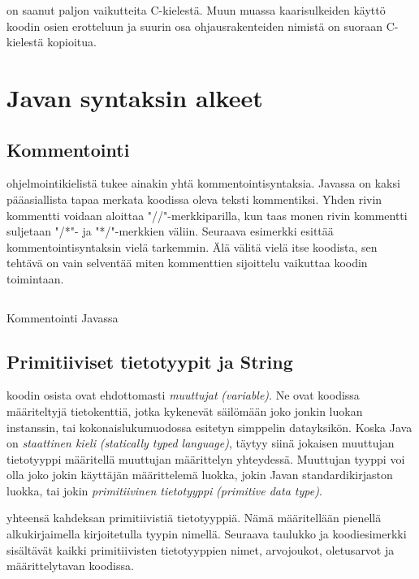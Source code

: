 \documentclass{tufte-book}
\newcommand{\eng}[1]{\textit{(#1)}}
\newcommand{\new}[1]{\textit{\gls{#1}}}
\newcommand{\neweng}[2]{\new{#1} \eng{#2}}
\newcommand{\code}[3]{
\begin{listing}
    \inputminted{java}{OhjelmointiopasEsimerkit/src/#1/#2.java}
    \caption{#3}
    \label{Java-#1-#2}
\end{listing}
}
\begin{document}
 on saanut paljon vaikutteita C-kielestä. Muun muassa kaarisulkeiden
käyttö koodin osien erotteluun ja suurin osa ohjausrakenteiden nimistä on suoraan C-kielestä
kopioitua.

\section{Javan syntaksin alkeet}

\subsection{Kommentointi}

 ohjelmointikielistä tukee ainakin yhtä kommentointisyntaksia. Javassa on
kaksi pääasiallista tapaa merkata koodissa oleva teksti kommentiksi. Yhden rivin kommentti voidaan
aloittaa "//"-merkkiparilla, kun taas monen rivin kommentti suljetaan "/*"- ja "*/"-merkkien
väliin. Seuraava esimerkki esittää kommentointisyntaksin vielä tarkemmin. Älä välitä vielä itse
koodista, sen tehtävä on vain selventää miten kommenttien sijoittelu vaikuttaa koodin toimintaan.

\code{week2}{CommentingExample}{Kommentointi Javassa}

\subsection{Primitiiviset tietotyypit ja String}

 koodin osista ovat ehdottomasti \textit{\gls{muuttuja}t}
\eng{variable}. Ne ovat koodissa määriteltyjä tietokenttiä, jotka kykenevät säilömään joko jonkin
luokan instanssin, tai kokonaislukumuodossa esitetyn simppelin datayksikön. Koska Java on 
\neweng{staattinen kieli}{statically typed language}, täytyy siinä jokaisen muuttujan tietotyyppi
määritellä muuttujan määrittelyn yhteydessä. Muuttujan tyyppi voi olla joko jokin käyttäjän
määrittelemä luokka, jokin Javan standardikirjaston luokka, tai jokin \neweng{primitiivinen
tietotyyppi}{primitive data type}.

 yhteensä kahdeksan primitiivistiä tietotyyppiä. Nämä määritellään
pienellä alkukirjaimella kirjoitetulla tyypin nimellä. Seuraava taulukko ja koodiesimerkki
sisältävät kaikki primitiivisten tietotyyppien nimet, arvojoukot, oletusarvot ja määrittelytavan
koodissa.
\end{document}
